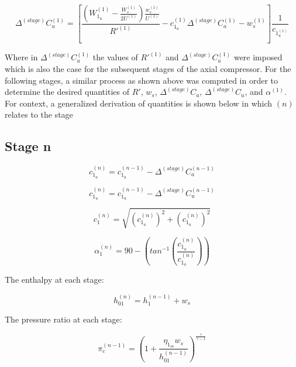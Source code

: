 \documentclass[titlepage]{article}
\begin{document}
\begin{equation}
    \Delta^{(stage)} C_{u}^{(1)} = \left[ \frac{\left( W_{1_{u}}^{(1)} - \frac{W_{s}^{(1)}}{2U^{(1)}}\right) \frac{w_{s}^{(1)}}{U^{(1)}}}{R'^{(1)}}  - c_{1_{a}}^{(1)} \Delta^{(stage)} C_{a}^{(1)} - w_{s}^{(1)} \right] \frac{1}{c_{1_{u}^{(1)}}}
\end{equation}

Where in $\Delta^{(stage)} C_{u}^{(1)}$ the values of $R'^{(1)}$ and $\Delta^{(stage)} C_{a}^{(1)}$ were imposed which is also the case for the subsequent 
stages of the axial compressor. For the following stages, a similar process as shown above was computed in order to determine the desired quantities of 
 $R'$, $w_{s}$, $\Delta^{(stage)} C_{a}$, $\Delta^{(stage)} C_{u}$, and $\alpha^{(1)}$. For context, a generalized derivation of quantities is shown below in
 which $(n)$ relates to the stage

 \subsection{Stage n}

 \begin{equation}
    c_{1_{a}}^{(n)} = c_{1_{a}}^{(n-1)} - \Delta^{(stage)} C_{a}^{(n-1)} 
 \end{equation}

 \begin{equation}
    c_{1_{u}}^{(n)} = c_{1_{u}}^{(n-1)} - \Delta^{(stage)} C_{u}^{(n-1)}
 \end{equation}

 \begin{equation}
    c_{1}^{(n)} = \sqrt{(c_{1_{a}}^{(n)})^{2} + (c_{1_{u}}^{(n)})^{2}}
 \end{equation}

\begin{equation}
    \alpha_{1}^{(n)} = 90 - \left(tan^{-1}\left(\frac{c_{1_{u}}^{(n)}}{c_{1_{a}}^{(n)}}\right) \right)
\end{equation}

The enthalpy at each stage:

\begin{equation}
    h_{01}^{(n)} = h_{1}^{(n-1)} + w_{s}
\end{equation}

The pressure ratio at each stage:

\begin{equation}
    \pi_{c}^{(n-1)} = \left(1 + \frac{\eta_{1_{m}}w_{s}}{h_{01}^{(n-1)}} \right)^{\frac{\gamma}{\gamma-1}}
\end{equation}
\end{document}
